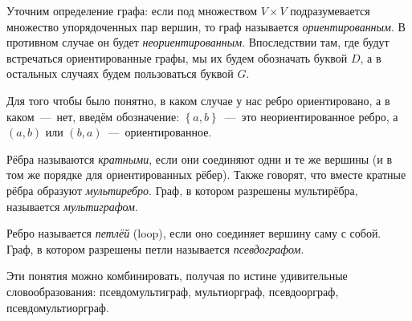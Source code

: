 	Уточним определение графа: если под множеством $V \times V$ подразумевается множество упорядоченных пар вершин, то граф называется \emph{ориентированным}. В противном случае он будет \emph{неориентированным}. Впоследствии там, где будут встречаться ориентированные графы, мы их будем обозначать буквой $D$, а в остальных случаях будем пользоваться буквой $G$.

	Для того чтобы было понятно, в каком случае у нас ребро ориентировано, а в каком~---~нет, введём обозначение: $\left\lbrace a, b \right\rbrace$~---~это неориентированное ребро, а $(a, b)$ или $(b, a)$~---~ориентированное.
	
\begin{definition}
	Рёбра называются \emph{кратными}, если они соединяют одни и те же вершины (и в том же порядке для ориентированных рёбер). Также говорят, что вместе кратные рёбра образуют \emph{мультиребро}. Граф, в котором разрешены мультирёбра, называется \emph{мультиграфом}.
\end{definition}

\begin{definition}
	Ребро называется \emph{петлёй} (loop), если оно соединяет вершину саму с собой. Граф, в котором разрешены петли называется \emph{псевдографом}.
\end{definition}

	Эти понятия можно комбинировать, получая по истине удивительные словообразования: псевдомультиграф, мультиорграф, псевдоорграф, псевдомультиорграф.

